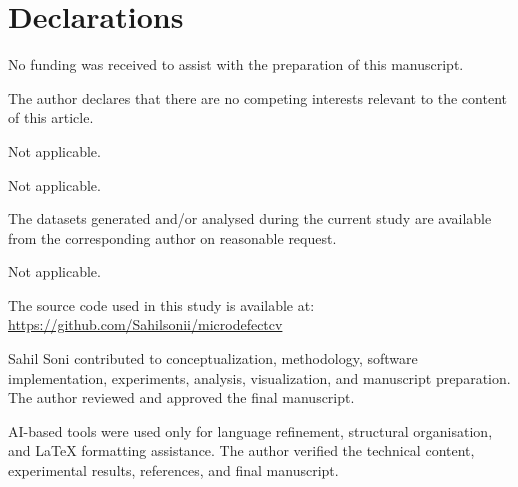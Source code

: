 \documentclass[pdflatex,sn-mathphys-num,iicol]{sn-jnl}
\theoremstyle{thmstyleone}
\theoremstyle{thmstyletwo}
\theoremstyle{thmstylethree}
\begin{document}

\section*{Declarations}

No funding was received to assist with the preparation of this
manuscript.

The author declares that there are no competing interests relevant to
the content of this article.

Not applicable.

Not applicable.

The datasets generated and/or analysed during the current study are
available from the corresponding author on reasonable request.

Not applicable.

The source code used in this study is available at:
\url{https://github.com/Sahilsonii/microdefectcv}

Sahil Soni contributed to conceptualization, methodology, software
implementation, experiments, analysis, visualization, and manuscript
preparation. The author reviewed and approved the final manuscript.

AI-based tools were used only for language refinement, structural
organisation, and LaTeX formatting assistance. The author verified
the technical content, experimental results, references, and final
manuscript.

\end{document}
